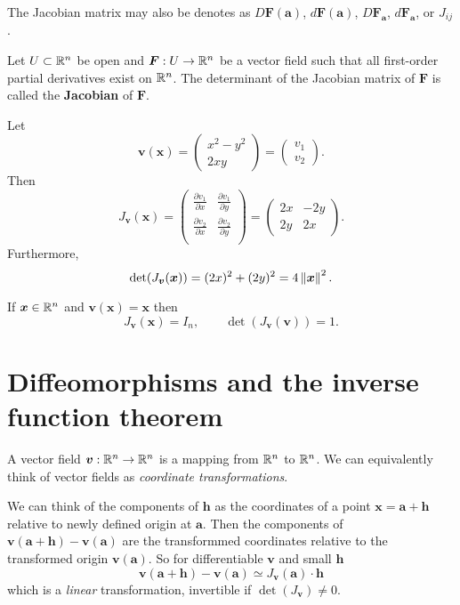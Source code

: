 \begin{remark}
    The Jacobian matrix may also be denotes as
    $D\bm F(\bm a)$, $d\bm F(\bm a)$, $D\bm F_{\bm a}$, $d\bm F_{\bm a}$, or $J_{ij}$.
\end{remark}

\begin{definition}[Jacobian]
    Let $U \subset \mathbb{R}^n$ be open and
    $\bm F: U \to \mathbb{R}^n$ be a vector field 
    such that all first-order partial derivatives exist on $\mathbb{R}^n$.
    The determinant of the Jacobian matrix of $\bm F$ 
    is called the \textbf{Jacobian} of $\bm F$.
\end{definition}

\begin{example}
    Let
    \[ \bm v(\bm x) =
        \begin{pmatrix}
            x^2 - y^2 \\ 2xy
        \end{pmatrix} =
        \begin{pmatrix}
            v_1 \\ v_2
        \end{pmatrix}. \]
    Then
    \[
        J_{\bm v}(\bm x) =
        \begin{pmatrix}
            \frac{\partial v_1}{\partial x} & \frac{\partial v_1}{\partial y} \\
            \frac{\partial v_2}{\partial x} & \frac{\partial v_2}{\partial y} \\
        \end{pmatrix} =
        \begin{pmatrix}
            2x & -2y \\
            2y & 2x
        \end{pmatrix}.
    \]
    Furthermore, 
    \[
        \det(J_{\bm v}(\bm x)) = (2x)^2 + (2y)^2 = 4 \left\lVert\bm x\right\rVert^2.
    \]
\end{example}

\begin{example}
    If $\bm x \in \mathbb{R}^n$ and $\bm v(\bm x) = \bm x$ then
    \[ J_{\bm v}(\bm x) = I_n, \qquad \det(J_{\bm v}(\bm v)) = 1. \]
\end{example}

\section{Diffeomorphisms and the inverse function theorem}

A vector field $\bm v: \mathbb{R}^n \to \mathbb{R}^n$ is a mapping from $\mathbb{R}^n$ to $\mathbb{R}^n$.
We can equivalently think of vector fields as \emph{coordinate transformations}.

We can think of the components of $\bm h$ as the coordinates of a point
$\bm x = \bm a + \bm h$ relative to newly defined origin at $\bm a$. 
Then the components of 
$\bm v(\bm a + \bm h) - \bm v(\bm a)$ 
are the transformmed coordinates relative to the transformed origin 
$\bm v(\bm a)$.
So for differentiable $\bm v$ and small $\bm h$
\[ \bm v(\bm a + \bm h) - \bm v(\bm a) \simeq J_{\bm v}(\bm a) \cdot \bm h \]
which is a \emph{linear} transformation, invertible if
$\det(J_{\bm v}) \neq 0$.
